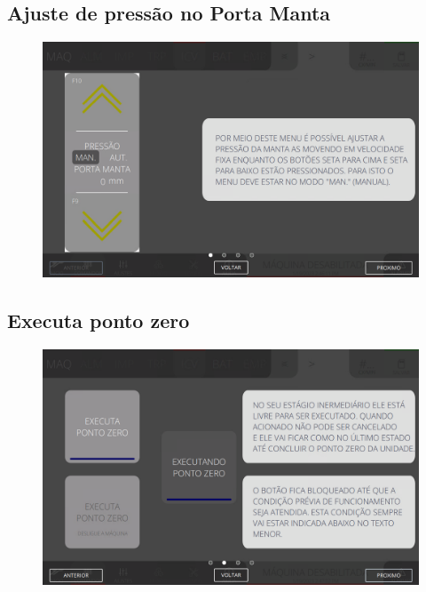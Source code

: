 \thispagestyle{fancy}
\vspace{\fill}
\subsection{Ajuste de pressão no Porta Manta}
\begin{figure}
    \centering
    \includegraphics[width=480 px,height=300 px]{src/imagesICV/06-dryCutter/commands/e-1.png}
\end{figure}

\newpage
\thispagestyle{fancy}
\vspace{\fill}
\subsection{Executa ponto zero}
\begin{figure}
    \centering
    \includegraphics[width=576 px,height=360 px]{src/imagesICV/06-dryCutter/commands/e-2.png}
\end{figure}

